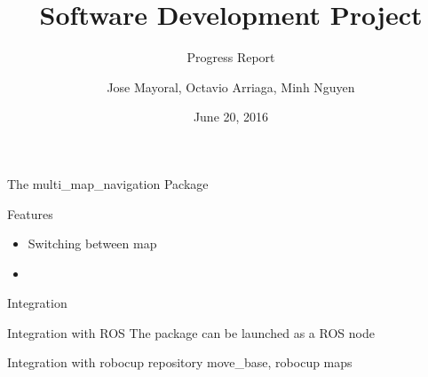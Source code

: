 \documentclass[14pt]{beamer}
\title{Software Development Project}
\subtitle{Progress Report}
\date{June 20, 2016}
\author{Jose Mayoral, Octavio Arriaga, Minh Nguyen}
\begin{document}
\maketitle

\begin{frame}{The multi\_map\_navigation Package}
    \begin{alertblock}{Features}
        \begin{itemize}
            \item Switching between map
            \item 
        \end{itemize}
    \end{alertblock}
\end{frame}

\begin{frame}{Integration}
    \begin{alertblock}{Integration with ROS}
        The package can be launched as a ROS node
    \end{alertblock}
    \begin{alertblock}{Integration with robocup repository}
    move\_base, robocup maps
    \end{alertblock}
\end{frame}

\end{document}
